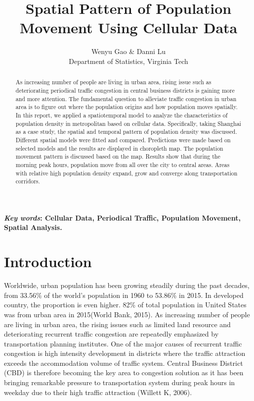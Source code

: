 \documentclass[hidelinks,12pt]{article}
\date{}
\author{Wenyu Gao \& Danni Lu \\ Department of Statistics, Virginia Tech}
\title{Spatial Pattern of Population Movement Using Cellular Data }
\begin{document}
	\maketitle
	
	\begin{abstract}
		As increasing number of people are living in urban area, rising issue such as deteriorating periodical traffic congestion in central business districts is gaining more and more attention. The fundamental question to alleviate traffic congestion in urban area is to figure out where the population origins and how population moves spatially. In this report, we applied a spatiotemporal model to analyze the characteristics of population density in metropolitan based on cellular data. Specifically, taking Shanghai as a case study, the spatial and temporal pattern of population density was discussed. Different spatial models were fitted and compared. Predictions were made based on selected models and the results are displayed in choropleth map. The population movement pattern is discussed based on the map. Results show that during the morning peak hours, population move from all over the city to central areas. Areas with relative high population density expand, grow and converge along transportation corridors. 
	\end{abstract}
	\textbf{ {\em Key words}: Cellular Data, Periodical Traffic, Population Movement, Spatial Analysis.}
	
	\section{Introduction}\label{sec:intro}
	Worldwide, urban population has been growing steadily during the past decades, from 33.56\% of the world’s population in 1960 to 53.86\% in 2015. In developed country, the proportion is even higher. 82\% of total population in United States was from urban area in 2015(World Bank, 2015). As increasing number of people are living in urban area, the rising issues such as limited land resource and deteriorating recurrent traffic congestion are repeatedly emphasized by transportation planning institutes. One of the major causes of recurrent traffic congestion is high intensity development in districts where the traffic attraction exceeds the accommodation volume of traffic system. Central Business District (CBD) is therefore becoming the key area to congestion solution as it has been bringing remarkable pressure to transportation system during peak hours in weekday due to their high traffic attraction (Willett K, 2006). 
	
\end{document}
